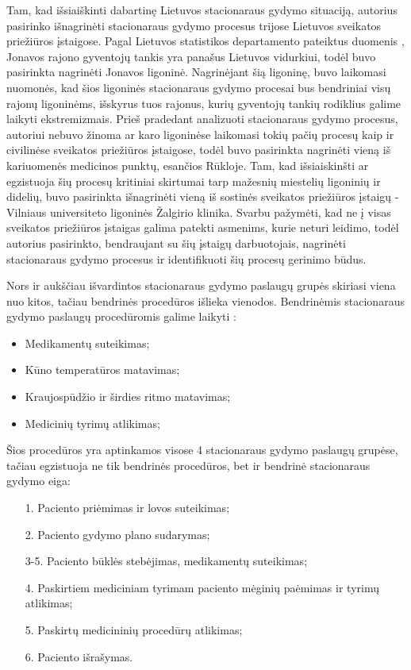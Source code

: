 Tam, kad išsiaiškinti dabartinę Lietuvos stacionaraus gydymo situaciją, autorius pasirinko išnagrinėti stacionaraus gydymo procesus trijose Lietuvos sveikatos priežiūros įstaigose. Pagal Lietuvos statistikos departamento pateiktus duomenis \cite{Gyvento2017}, Jonavos rajono gyventojų tankis yra panašus Lietuvos vidurkiui, todėl buvo pasirinkta nagrinėti Jonavos ligoninė. Nagrinėjant šią ligoninę, buvo laikomasi nuomonės, kad šios ligoninės stacionaraus gydymo procesai bus bendriniai visų rajonų ligoninėms, išskyrus tuos rajonus, kurių gyventojų tankių rodiklius galime laikyti ekstremizmais. Prieš pradedant analizuoti stacionaraus gydymo procesus, autoriui nebuvo žinoma ar karo ligoninėse laikomasi tokių pačių procesų kaip ir civilinėse sveikatos priežiūros įstaigose, todėl buvo pasirinkta nagrinėti vieną iš kariuomenės medicinos punktų, esančios Rūkloje. Tam, kad išsiaiskinšti ar egzistuoja šių procesų kritiniai skirtumai tarp mažesnių miestelių ligoninių ir didelių, buvo pasirinkta išnagrinėti vieną iš sostinės sveikatos priežiūros įstaigų - Vilniaus universiteto ligoninės Žalgirio klinika. Svarbu pažymėti, kad ne į visas sveikatos priežiūros įstaigas galima patekti asmenims, kurie neturi leidimo, todėl autorius pasirinkto, bendraujant su šių įstaigų darbuotojais, nagrinėti stacionaraus gydymo procesus ir identifikuoti šių procesų gerinimo būdus.

Nors ir aukščiau išvardintos stacionaraus gydymo paslaugų grupės skiriasi viena nuo kitos, tačiau bendrinės procedūros išlieka vienodos. Bendrinėmis stacionaraus gydymo paslaugų procedūromis galime laikyti \cite{Gautam}: 
\begin{itemize}
    \item Medikamentų suteikimas;
    \item Kūno temperatūros matavimas;
    \item Kraujospūdžio ir širdies ritmo matavimas;
    \item Medicinių tyrimų atlikimas;  
\end{itemize}
Šios procedūros yra aptinkamos visose 4 stacionaraus gydymo paslaugų grupėse, tačiau egzistuoja ne tik bendrinės procedūros, bet ir bendrinė stacionaraus gydymo eiga:
\begin{itemize}
    \item [1.] Paciento priėmimas ir lovos suteikimas;
    \item [2.] Paciento gydymo plano sudarymas;
    \item [3-5.] Paciento būklės stebėjimas, medikamentų suteikimas;
    \item [4.] Paskirtiem mediciniam tyrimam paciento mėginių paėmimas ir tyrimų atlikimas;
    \item [5.] Paskirtų medicininių procedūrų atlikimas;
    \item [6.] Paciento išrašymas.
\end{itemize}

